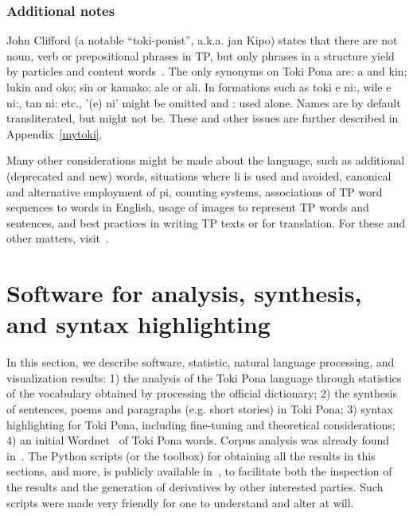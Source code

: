 \documentclass{article}
\begin{document}

\subsubsection{Additional notes}
John Clifford (a notable ``toki-ponist'', a.k.a. jan Kipo)
states that there are not noun, verb or prepositional
phrases in TP, but only phrases in a structure
yield by particles and content words~\cite{janKipo}.
The only synonyms on Toki Pona are:
a and kin; lukin and oko; sin or kamako;
ale or ali.
In formations such as
toki e ni:, wile e ni:, tan ni: etc.,
'(e) ni' might be omitted and : used alone.
Names are by default transliterated,
but might not be.
These and other issues are further described in Appendix~\ref{mytoki}.

Many other considerations might be made about the language,
such as additional (deprecated and new) words,
situations where li is used and avoided,
canonical and alternative employment of pi,
counting systems,
associations of TP word sequences to words in English,
usage of images to represent TP words and sentences,
and best practices in writing TP texts or for translation.
For these and other matters, visit~\cite{tpLang,kama,gdoc,tp4}.

\section{Software for analysis, synthesis, and syntax highlighting}\label{hacks}
In this section,
we describe software, statistic, natural language processing,
and visualization results:
1)
the analysis of the Toki Pona language through statistics
of the vocabulary obtained by processing the official dictionary;
2)
the synthesis of sentences, poems and paragraphs (e.g. short stories)
in Toki Pona;
3)
syntax highlighting for Toki Pona,
including fine-tuning and theoretical
considerations;
4)
an initial Wordnet~\cite{wordnet} of
Toki Pona words.
Corpus analysis was already found in~\cite{corpus}.
The Python scripts (or the toolbox)
for obtaining all the results in this sections,
and more, is publicly available in~\cite{tokipona},
to facilitate both the inspection of the results and the
generation of derivatives by other interested parties.
Such scripts were made very friendly for one to understand and alter
at will.
\end{document}
